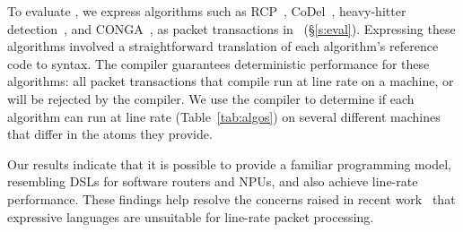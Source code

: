 To evaluate \pktlanguage, we express algorithms such as RCP~\cite{rcp},
CoDel~\cite{codel}, heavy-hitter detection~\cite{opensketch}, and
CONGA~\cite{conga}, as packet transactions in \pktlanguage~(\S\ref{s:eval}).
Expressing these algorithms involved a straightforward translation of each
algorithm's reference code to \pktlanguage syntax.  The \pktlanguage compiler
guarantees deterministic performance for these algorithms: all packet
transactions that compile run at line rate on a \absmachine machine, or will be
rejected by the compiler.  We use the \pktlanguage compiler to determine if
each algorithm can run at line rate (Table~\ref{tab:algos}) on several
different \absmachine machines that differ in the atoms they provide.

Our results indicate that it is possible to provide a familiar programming
model, resembling DSLs for software routers and NPUs, and also achieve
line-rate performance. These findings help resolve the concerns raised in
recent work~\cite{p4} that expressive languages are unsuitable for line-rate
packet processing.

